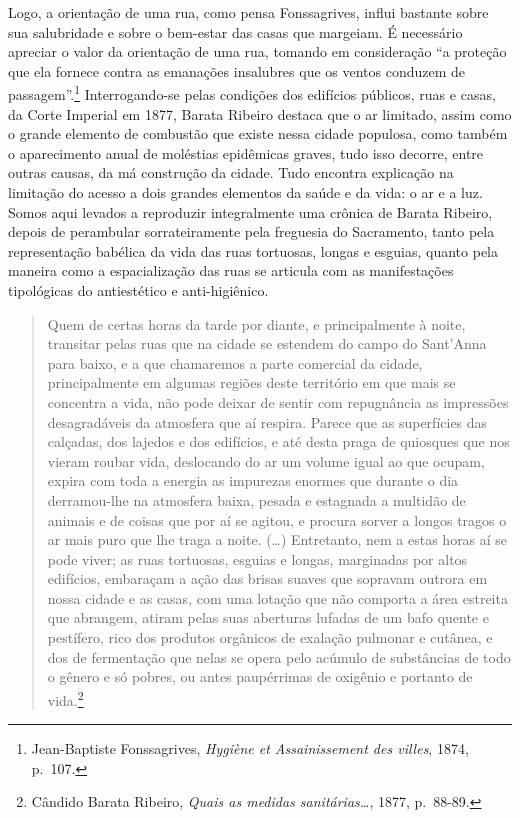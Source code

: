 Logo, a orientação de uma rua, como pensa Fonssagrives, influi bastante
sobre sua salubridade e sobre o bem-estar das casas que margeiam. É
necessário apreciar o valor da orientação de uma rua, tomando em
consideração ``a proteção que ela fornece contra as emanações insalubres
que os ventos conduzem de passagem''.\footnote{Jean-Baptiste
  Fonssagrives, \textit{Hygiène et Assainissement des villes}, 1874,
  p.~107.} Interrogando-se pelas condições dos edifícios públicos, ruas
e casas, da Corte Imperial em 1877, Barata Ribeiro destaca que o ar
limitado, assim como o grande elemento de combustão que existe nessa
cidade populosa, como também o aparecimento anual de moléstias
epidêmicas graves, tudo isso decorre, entre outras causas, da má
construção da cidade. Tudo encontra explicação na limitação do acesso a
dois grandes elementos da saúde e da vida: o ar e a luz. Somos aqui
levados a reproduzir integralmente uma crônica de Barata Ribeiro, depois
de perambular sorrateiramente pela freguesia do Sacramento, tanto pela
representação babélica da vida das ruas tortuosas, longas e esguias,
quanto pela maneira como a espacialização das ruas se articula com as
manifestações tipológicas do antiestético e anti-higiênico.

\begin{quote}
Quem de certas horas da tarde por diante, e principalmente à noite,
transitar pelas ruas que na cidade se estendem do campo do Sant'Anna
para baixo, e a que chamaremos a parte comercial da cidade,
principalmente em algumas regiões deste território em que mais se
concentra a vida, não pode deixar de sentir com repugnância as
impressões desagradáveis da atmosfera que aí respira. Parece que as
superfícies das calçadas, dos lajedos e dos edifícios, e até desta praga
de quiosques que nos vieram roubar vida, deslocando do ar um volume
igual ao que ocupam, expira com toda a energia as impurezas enormes que
durante o dia derramou-lhe na atmosfera baixa, pesada e estagnada a
multidão de animais e de coisas que por aí se agitou, e procura sorver a
longos tragos o ar mais puro que lhe traga a noite. (\ldots{})
Entretanto, nem a estas horas aí se pode viver; as ruas tortuosas,
esguias e longas, marginadas por altos edifícios, embaraçam a ação das
brisas suaves que sopravam outrora em nossa cidade e as casas, com uma
lotação que não comporta a área estreita que abrangem, atiram pelas suas
aberturas lufadas de um bafo quente e pestífero, rico dos produtos
orgânicos de exalação pulmonar e cutânea, e dos de fermentação que nelas
se opera pelo acúmulo de substâncias de todo o gênero e só pobres, ou
antes paupérrimas de oxigênio e portanto de vida.\footnote{Cândido
  Barata Ribeiro, \textit{Quais as medidas sanitárias\ldots{}}, 1877,
  p.~88-89.}
\end{quote}

